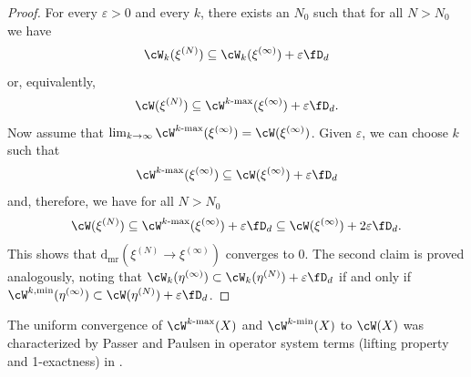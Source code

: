 \begin{proof}
  For every $\varepsilon>0$ and every $k$, there exists an $N_0$ such that for all $N>N_0$ we have
  \[\cW_k(\xi^{(N)})\subseteq \cW_k(\xi^{(\infty)}) +  \varepsilon {\fD_d}\]
  or, equivalently,
  \[\cW(\xi^{(N)})\subseteq \cW^{k\text{-$\max$}}(\xi^{(\infty)}) + \varepsilon {\fD_d}.\]
  Now assume that $\lim_{k\to\infty}\cW^{k\text{-$\max$}}(\xi^{(\infty)})=\cW(\xi^{(\infty)})$.
  Given $\varepsilon$, we can choose $k$ such that
  \[\cW^{k\text{-$\max$}}(\xi^{(\infty)})\subseteq \cW(\xi^{(\infty)}) +\varepsilon {\fD_d}\]
  and, therefore, we have for all $N>N_0$ 
  \[\cW(\xi^{(N)})\subseteq \cW^{k\text{-$\max$}}(\xi^{(\infty)}) + \varepsilon {\fD_d}\subseteq  \cW(\xi^{(\infty)}) + 2 \varepsilon {\fD_d}.\]
  This shows that $\mathrm{d_{mr}}(\xi^{(N)}\to\xi^{(\infty)})$ converges to $0$. The second claim is proved analogously, noting that
  $\cW_k(\eta^{(\infty)})\subset \cW_k(\eta^{(N)})  +\varepsilon {\fD_d}$ if and only if $\cW^{k,\min}(\eta^{(\infty)})\subset \cW(\eta^{(N)})+\varepsilon {\fD_d}$.
\end{proof}


The uniform convergence of $\cW^{k\text{-$\max$}}(X)$ and $\cW^{k\text{-$\min$}}(X)$ to $\cW(X)$ was characterized by Passer and Paulsen in operator system terms (lifting property and 1-exactness) in \cite[Theorems 3.3 and 3.7]{PaPa21}. 

